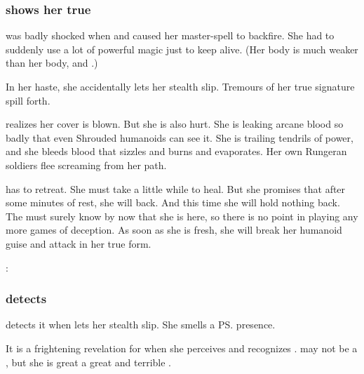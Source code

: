 \subsubsection{\Nzessuacrith shows her true \colours}
\Takestsha was badly shocked when  and caused her \quo{\EreshKali} master-spell to backfire. 
She had to suddenly use a lot of powerful magic just to keep alive. 
(Her \human body is much weaker than her \draconian body, and .) 

In her haste, she accidentally lets her stealth slip.
Tremours of her true \vertex signature spill forth. 

\Takestsha realizes her cover is blown. 
But she is also hurt. 
She is leaking arcane blood so badly that even Shrouded humanoids can see it.
She is trailing tendrils of power, and she bleeds blood that sizzles and burns and evaporates. 
Her own Rungeran soldiers flee screaming from her path.

\Takestsha has to retreat. 
She must take a little while to heal. 
But she promises that after some minutes of rest, she will back.
And this time she will hold nothing back.
The \resphain must surely know by now that she is here, so there is no point in playing any more games of deception.
As soon as she is fresh, she will break her humanoid guise and attack in her true form. 

\begin{prose}
  \Takestsha: 
\end{prose}






\subsubsection{\Achsah detects \Nzessuacrith}
\Achsah detects it when \Nzessuacrith lets her stealth slip. 
She smells a \ps{\dragon}{} presence. 

It is a frightening  revelation for \Achsah when she perceives and recognizes \Nzessuacrith.
\Nzessuacrith may not be a \shaeeroth, but she is great a great and terrible \dragon. 

